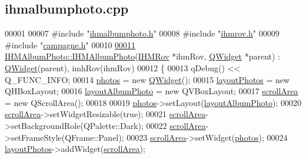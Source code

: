 \hypertarget{ihmalbumphoto_8cpp_source}{}\subsection{ihmalbumphoto.\+cpp}
\label{ihmalbumphoto_8cpp_source}

\begin{DoxyCode}
00001 
00007 \textcolor{preprocessor}{#include "\hyperlink{ihmalbumphoto_8h}{ihmalbumphoto.h}"}
00008 \textcolor{preprocessor}{#include "\hyperlink{ihmrov_8h}{ihmrov.h}"}
00009 \textcolor{preprocessor}{#include "\hyperlink{campagne_8h}{campagne.h}"}
00010 
\hyperlink{class_i_h_m_album_photo_aefa56aaad40d6cb0ddcf769f149ab0ad}{00011} \hyperlink{class_i_h_m_album_photo_aefa56aaad40d6cb0ddcf769f149ab0ad}{IHMAlbumPhoto::IHMAlbumPhoto}(\hyperlink{class_i_h_m_rov}{IHMRov} *ihmRov, 
      \hyperlink{class_q_widget}{QWidget} *parent) : \hyperlink{class_q_widget}{QWidget}(parent), imhRov(ihmRov)
00012 \{
00013     qDebug() << Q\_FUNC\_INFO;
00014     \hyperlink{class_i_h_m_album_photo_a0a58f758260250ac5520f2430d708d87}{photos} = \textcolor{keyword}{new} \hyperlink{class_q_widget}{QWidget}();
00015     \hyperlink{class_i_h_m_album_photo_aabe492a016823fa63259c8e5d5b58e9d}{layoutPhotos} = \textcolor{keyword}{new} QHBoxLayout;
00016     \hyperlink{class_i_h_m_album_photo_a1b4028248430efc384e34b0151709fa0}{layoutAlbumPhoto} = \textcolor{keyword}{new} QVBoxLayout;
00017     \hyperlink{class_i_h_m_album_photo_a9ed730123be1c9ca6f7aa078ec9e0556}{scrollArea} = \textcolor{keyword}{new} QScrollArea();
00018 
00019     \hyperlink{class_i_h_m_album_photo_a0a58f758260250ac5520f2430d708d87}{photos}->setLayout(\hyperlink{class_i_h_m_album_photo_a1b4028248430efc384e34b0151709fa0}{layoutAlbumPhoto});
00020     \hyperlink{class_i_h_m_album_photo_a9ed730123be1c9ca6f7aa078ec9e0556}{scrollArea}->setWidgetResizable(\textcolor{keyword}{true});
00021     \hyperlink{class_i_h_m_album_photo_a9ed730123be1c9ca6f7aa078ec9e0556}{scrollArea}->setBackgroundRole(QPalette::Dark);
00022     \hyperlink{class_i_h_m_album_photo_a9ed730123be1c9ca6f7aa078ec9e0556}{scrollArea}->setFrameStyle(QFrame::Panel);
00023     \hyperlink{class_i_h_m_album_photo_a9ed730123be1c9ca6f7aa078ec9e0556}{scrollArea}->setWidget(\hyperlink{class_i_h_m_album_photo_a0a58f758260250ac5520f2430d708d87}{photos});
00024     \hyperlink{class_i_h_m_album_photo_aabe492a016823fa63259c8e5d5b58e9d}{layoutPhotos}->addWidget(\hyperlink{class_i_h_m_album_photo_a9ed730123be1c9ca6f7aa078ec9e0556}{scrollArea});

\end{DoxyCode}
